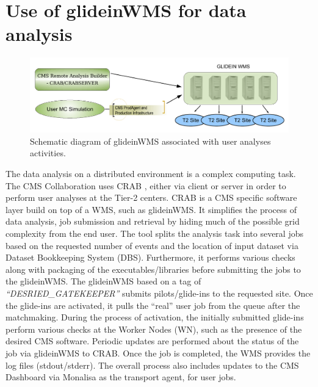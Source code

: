 \documentclass[a4paper]{jpconf}
\begin{document}
\section{Use of glideinWMS for data analysis}
\begin{figure}
\begin{center}
\includegraphics[scale=0.4]{user_analysis}
\end{center}
\caption{Schematic diagram of glideinWMS associated with user analyses activities.}
\label{fig:user_analysis}
\end{figure}
The data analysis on a distributed environment is a complex computing task. The CMS Collaboration
uses CRAB \cite{bib:cms_crab}, either via client or server in order to perform user analyses at the Tier-2 centers.
CRAB is a CMS specific software layer build on top of a WMS, such as glideinWMS. It simplifies the process 
of data analysis, job submission and retrieval by hiding much of the possible grid complexity from the
end user. The tool splits the analysis task into several jobs based on the requested number of events and
the location of input dataset via Dataset Bookkeeping System (DBS). Furthermore, it performs various checks along with 
packaging of the executables/libraries before submitting the jobs to the glideinWMS. The glideinWMS based 
on a tag of \emph{``DESRIED\_GATEKEEPER''} submits pilots/glide-ins to the requested site. Once the glide-ins are activated, 
it pulls the ``real'' user job from the queue after the matchmaking. During the process of activation, the 
initially submitted glide-ins perform various checks at the Worker Nodes (WN), such as the presence of the desired 
CMS software. Periodic updates are performed about the status of the job via glideinWMS to CRAB. Once the 
job is completed, the WMS provides the log files (stdout/stderr). The overall process also includes updates 
to the CMS Dashboard via Monalisa as the transport agent, for user jobs.
\end{document}
